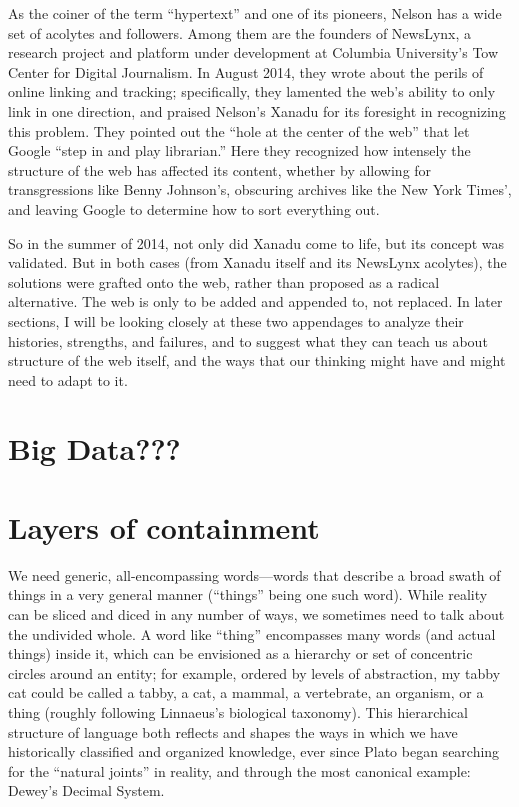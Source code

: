 As the coiner of the term ``hypertext'' and one of its pioneers, Nelson has a wide set of acolytes and followers. Among them are the founders of NewsLynx, a research project and platform under development at Columbia University's Tow Center for Digital Journalism. In August 2014, they wrote about the perils of online linking and tracking; specifically, they lamented the web's ability to only link in one direction, and praised Nelson's Xanadu for its foresight in recognizing this problem. They pointed out the ``hole at the center of the web'' that let Google ``step in and play librarian.'' Here they recognized how intensely the structure of the web has affected its content, whether by allowing for transgressions like Benny Johnson's, obscuring archives like the New York Times', and leaving Google to determine how to sort everything out.

So in the summer of 2014, not only did Xanadu come to life, but its concept was validated. But in both cases (from Xanadu itself and its NewsLynx acolytes), the solutions were grafted onto the web, rather than proposed as a radical alternative. The web is only to be added and appended to, not replaced. In later sections, I will be looking closely at these two appendages to analyze their histories, strengths, and failures, and to suggest what they can teach us about structure of the web itself, and the ways that our thinking might have and might need to adapt to it.

\section{Big Data???}

\section{Layers of containment}

We need generic, all-encompassing words—words that describe a broad swath of things in a very general manner (“things” being one such word). While reality can be sliced and diced in any number of ways, we sometimes need to talk about the undivided whole. A word like “thing” encompasses many words (and actual things) inside it, which can be envisioned as a hierarchy or set of concentric circles around an entity; for example, ordered by levels of abstraction, my tabby cat could be called a tabby, a cat, a mammal, a vertebrate, an organism, or a thing (roughly following Linnaeus’s biological taxonomy). This hierarchical structure of language both reflects and shapes the ways in which we have historically classified and organized knowledge, ever since Plato began searching for the “natural joints” in reality, and through the most canonical example: Dewey’s Decimal System.

